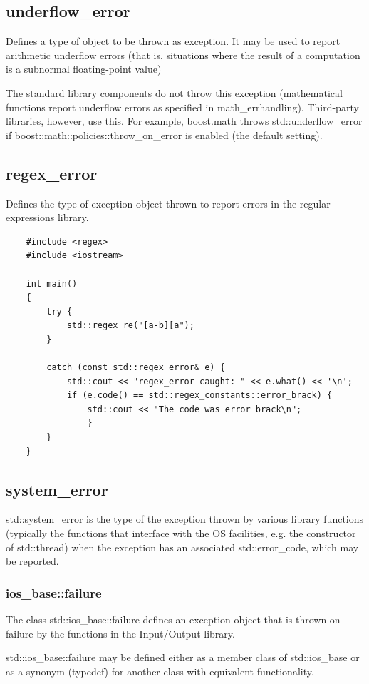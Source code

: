 \documentclass[UTF8,a4paper,12pt]{ctexbook}
\begin{document}
		\subsection{underflow\_error}
			Defines a type of object to be thrown as exception. It may be used to report arithmetic underflow errors (that is, situations where the result of a computation is a subnormal floating-point value)
			
			The standard library components do not throw this exception (mathematical functions report underflow errors as specified in math\_errhandling). Third-party libraries, however, use this. For example, boost.math throws std::underflow\_error if boost::math::policies::throw\_on\_error is enabled (the default setting). 
		\subsection{regex\_error}
			Defines the type of exception object thrown to report errors in the regular expressions library. 
\begin{lstlisting}
	#include <regex>
	#include <iostream>
				
	int main()
	{
		try {
			std::regex re("[a-b][a");
		} 
					
		catch (const std::regex_error& e) {
			std::cout << "regex_error caught: " << e.what() << '\n';
			if (e.code() == std::regex_constants::error_brack) {
				std::cout << "The code was error_brack\n";
				}
		}
	}
\end{lstlisting}
		\subsection{system\_error}
			std::system\_error is the type of the exception thrown by various library functions (typically the functions that interface with the OS facilities, e.g. the constructor of std::thread) when the exception has an associated std::error\_code, which may be reported. 
			\subsubsection{ios\_base::failure}
				The class std::ios\_base::failure defines an exception object that is thrown on failure by the functions in the Input/Output library.
				
				std::ios\_base::failure may be defined either as a member class of std::ios\_base or as a synonym (typedef) for another class with equivalent functionality. 
				
\end{document}
